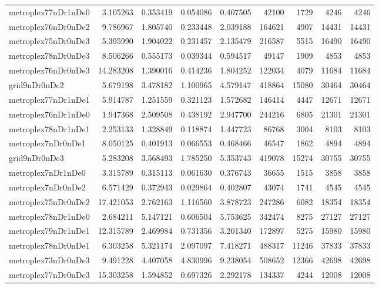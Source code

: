 \begin{longtable}{|l|r|r|r|r|r|r|r|r|}
metroplex77nDr1nDe0 & 3.105263 & 0.353419 & 0.054086 & 0.407505 & 42100 & 1729 & 4246 & 4246 \\
metroplex76nDr0nDe2 & 9.786967 & 1.805740 & 0.233448 & 2.039188 & 164621 & 4907 & 14431 & 14431 \\
metroplex75nDr0nDe3 & 5.395990 & 1.904022 & 0.231457 & 2.135479 & 216587 & 5515 & 16490 & 16490 \\
metroplex78nDr0nDe3 & 8.506266 & 0.555173 & 0.039344 & 0.594517 & 49147 & 1909 & 4853 & 4853 \\
metroplex76nDr0nDe3 & 14.283208 & 1.390016 & 0.414236 & 1.804252 & 122034 & 4079 & 11684 & 11684 \\
grid9nDr0nDe2 & 5.679198 & 3.478182 & 1.100965 & 4.579147 & 418864 & 15080 & 30464 & 30464 \\
metroplex77nDr1nDe1 & 5.914787 & 1.251559 & 0.321123 & 1.572682 & 146414 & 4447 & 12671 & 12671 \\
metroplex76nDr1nDe0 & 1.947368 & 2.509508 & 0.438192 & 2.947700 & 244216 & 6805 & 21301 & 21301 \\
metroplex78nDr1nDe1 & 2.253133 & 1.328849 & 0.118874 & 1.447723 & 86768 & 3004 & 8103 & 8103 \\
metroplex7nDr0nDe1 & 8.050125 & 0.401913 & 0.066553 & 0.468466 & 46547 & 1862 & 4894 & 4894 \\
grid9nDr0nDe3 & 5.283208 & 3.568493 & 1.785250 & 5.353743 & 419078 & 15274 & 30755 & 30755 \\
metroplex7nDr1nDe0 & 3.315789 & 0.315113 & 0.061630 & 0.376743 & 36655 & 1515 & 3858 & 3858 \\
metroplex7nDr0nDe2 & 6.571429 & 0.372943 & 0.029864 & 0.402807 & 43074 & 1741 & 4545 & 4545 \\
metroplex75nDr0nDe2 & 17.421053 & 2.762163 & 1.116560 & 3.878723 & 247286 & 6082 & 18354 & 18354 \\
metroplex78nDr1nDe0 & 2.684211 & 5.147121 & 0.606504 & 5.753625 & 342474 & 8275 & 27127 & 27127 \\
metroplex79nDr1nDe1 & 12.315789 & 2.469984 & 0.731356 & 3.201340 & 172897 & 5275 & 15980 & 15980 \\
metroplex78nDr0nDe1 & 6.303258 & 5.321174 & 2.097097 & 7.418271 & 488317 & 11246 & 37833 & 37833 \\
metroplex73nDr0nDe3 & 9.491228 & 4.407058 & 4.830996 & 9.238054 & 508652 & 12366 & 42698 & 42698 \\
metroplex77nDr0nDe3 & 15.303258 & 1.594852 & 0.697326 & 2.292178 & 134337 & 4244 & 12008 & 12008 \\

\end{longtable}
